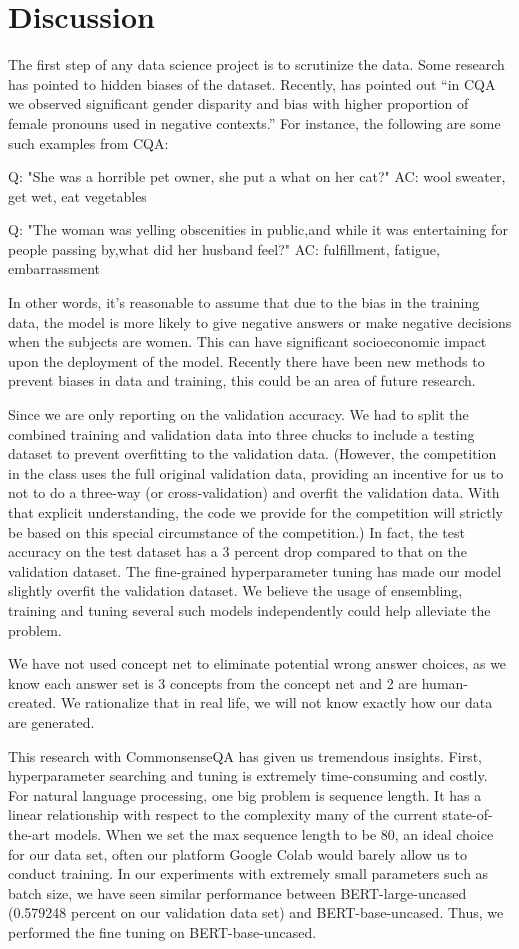 \documentclass[11pt,a4paper]{article}
\begin{document}
\section{Discussion}
The first step of any data science project is to scrutinize the data. Some research has pointed to hidden biases of the dataset. Recently, \citet{rajani2019explain} has pointed out “in CQA we observed significant gender disparity and bias with higher proportion of female pronouns used in negative contexts.” For instance, the following are some such examples from CQA:
 
Q: "She was a horrible pet owner, she put a what on her cat?"
AC: wool sweater, get wet, eat vegetables
 
Q: "The woman was yelling obscenities in public,and while it was entertaining for people passing by,what did her husband feel?"
AC: fulfillment, fatigue, embarrassment
 
In other words, it’s reasonable to assume that due to the bias in the training data, the model is more likely to give negative answers or make negative decisions when the subjects are women. This can have significant socioeconomic impact upon the deployment of the model. Recently there have been new methods to prevent biases in data and training, this could be an area of future research.
 
Since we are only reporting on the validation accuracy. We had to split the combined training and validation data into three chucks to include a testing dataset to prevent overfitting to the validation data. (However, the competition in the class uses the full original validation data, providing an incentive for us to not to do a three-way (or cross-validation) and overfit the validation data. With that explicit understanding, the code we provide for the competition will strictly be based on this special circumstance of the competition.) In fact, the test accuracy on the test dataset has a 3 percent drop compared to that on the validation dataset. The fine-grained hyperparameter tuning has made our model slightly overfit the validation dataset. We believe the usage of ensembling, training and tuning several such models independently could help alleviate the problem.
 
We have not used concept net to eliminate potential wrong answer choices, as we know each answer set is 3 concepts from the concept net and 2 are human-created. We rationalize that in real life, we will not know exactly how our data are generated.
 
This research with CommonsenseQA has given us tremendous insights. First, hyperparameter searching and tuning is extremely time-consuming and costly. For natural language processing, one big problem is sequence length. It has a linear relationship with respect to the complexity many of the current state-of-the-art models. When we set the max sequence length to be 80, an ideal choice for our data set, often our platform Google Colab would barely allow us to conduct training. In our experiments with extremely small parameters such as batch size, we have seen similar performance between BERT-large-uncased (0.579248 percent on our validation data set) and BERT-base-uncased. Thus, we performed the fine tuning on BERT-base-uncased.
\end{document}
